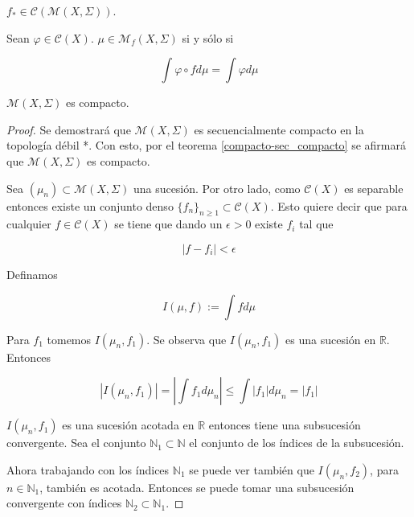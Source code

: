 \begin{lema}
	$f_* \in \mathcal{C}(\mathcal{M}(X,\Sigma))$. 
\end{lema}

\begin{lema}\label{lema3_krylov}
	Sean $\varphi \in \mathcal{C}(X)$. $\mu \in \mathcal{M}_f(X,\Sigma)$ si y sólo si
	
	\begin{equation}
		\int \varphi \circ f d\mu = \int \varphi d\mu
	\end{equation}
\end{lema}

\begin{lema}
	$\mathcal{M}(X,\Sigma)$ es compacto. 
\end{lema}

\begin{proof}
	Se demostrará que $\mathcal{M}(X,\Sigma)$ es secuencialmente compacto en la topología débil *. Con esto, por el teorema \ref{compacto-sec_compacto} se afirmará que $\mathcal{M}(X,\Sigma)$ es compacto.
	
	Sea $(\mu_n) \subset \mathcal{M}(X,\Sigma)$ una sucesión. Por otro lado, como $\mathcal{C}(X)$ es separable entonces existe un conjunto denso $\{f_n\}_{n \geq 1} \subset \mathcal{C}(X)$. Esto quiere decir que para cualquier $f \in \mathcal{C}(X)$ se tiene que dando un $\epsilon > 0$ existe $f_i$ tal que
	
	\begin{equation}
		|f - f_i| < \epsilon
	\end{equation}
	
	Definamos
	
	\begin{equation}
		I(\mu,f) := \int f d\mu
	\end{equation}
	
	Para $f_1$ tomemos $I(\mu_n,f_1)$. Se observa que $I(\mu_n,f_1)$ es una sucesión en $\mathbb{R}$. Entonces
	
	\begin{equation}
		|I(\mu_n,f_1)| = \left| \int f_1 d\mu_n \right| \leq \int |f_1| d\mu_n = |f_1|
	\end{equation} 
	
	$I(\mu_n,f_1)$ es una sucesión acotada en $\mathbb{R}$ entonces tiene una subsucesión convergente. Sea el conjunto $\mathbb{N}_1 \subset \mathbb{N}$ el conjunto de los índices de la subsucesión. 
	
	Ahora trabajando con los índices $\mathbb{N}_1$ se puede ver también que $I(\mu_n,f_2)$, para $n \in \mathbb{N}_1$, también es acotada. Entonces se puede tomar una subsucesión convergente con índices $\mathbb{N}_2 \subset \mathbb{N}_1$.
	

\end{proof}
